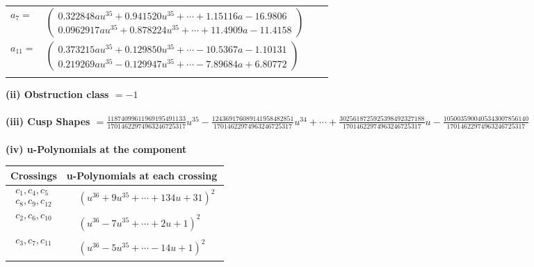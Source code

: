 \documentclass[1p]{elsarticle_modified}
\theoremstyle{definition}
\begin{document}
\begin{tabular}{m{7pt} m{180pt} m{7pt} m{180pt} }
\flushright $a_{7}=$&$\begin{pmatrix}0.322848 a u^{35}+0.941520 u^{35}+\cdots+1.15116 a-16.9806\\0.0962917 a u^{35}+0.878224 u^{35}+\cdots+11.4909 a-11.4158\end{pmatrix}$ \\
\flushright $a_{11}=$&$\begin{pmatrix}0.373215 a u^{35}+0.129850 u^{35}+\cdots-10.5367 a-1.10131\\0.219269 a u^{35}-0.129947 u^{35}+\cdots-7.89684 a+6.80772\end{pmatrix}$\\&\end{tabular}
\flushleft \textbf{(ii) Obstruction class $= -1$}\\~\\
\flushleft \textbf{(iii) Cusp Shapes $= \frac{11874099611969195491133}{17014622974963246725317} u^{35}-\frac{124369176089141958482851}{17014622974963246725317} u^{34}+\cdots+\frac{3025618725925398492327188}{17014622974963246725317} u-\frac{1050035900405343007856140}{17014622974963246725317}$}\\~\\
\newpage\renewcommand{\arraystretch}{1}
\flushleft \textbf{(iv) u-Polynomials at the component}\newline \\
\begin{tabular}{m{50pt}|m{274pt}}
Crossings & \hspace{64pt}u-Polynomials at each crossing \\
\hline $$\begin{aligned}c_{1},c_{4},c_{5}\\c_{8},c_{9},c_{12}\end{aligned}$$&$\begin{aligned}
&(u^{36}+9 u^{35}+\cdots+134 u+31)^{2}
\end{aligned}$\\
\hline $$\begin{aligned}c_{2},c_{6},c_{10}\end{aligned}$$&$\begin{aligned}
&(u^{36}-7 u^{35}+\cdots+2 u+1)^{2}
\end{aligned}$\\
\hline $$\begin{aligned}c_{3},c_{7},c_{11}\end{aligned}$$&$\begin{aligned}
&(u^{36}-5 u^{35}+\cdots-14 u+1)^{2}
\end{aligned}$\\
\hline
\end{tabular}\\~\\
\end{document}
